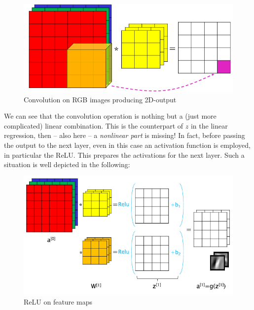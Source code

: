 \begin{figure}[h]
    \centering
    \includegraphics[scale=0.6]{img/CNN_RGB.png}
    \caption{Convolution on RGB images producing 2D-output}
\end{figure}

We can see that the convolution operation is nothing but a (just more complicated) linear combination. This is the counterpart of $z$ in the linear regression, then -- also here -- a \textit{nonlinear part} is missing! In fact, before passing the output to the next layer, even in this case an activation function is employed, in particular the ReLU. This prepares the activations for the next layer. Such a situation is well depicted in the following:

\begin{figure}[h]
    \centering
    \includegraphics[scale=0.7]{img/ReLU_CNN.png}
    \caption{ReLU on feature maps}
\end{figure}